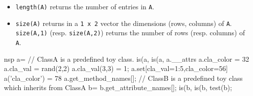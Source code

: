 \begin{itemize}
\item \verb+length(A)+ returns the number of entries in \verb+A+.
\item \verb+size(A)+ returns in a \verb+1 x 2+ vector the dimensions (rows, columns)
  of \verb+A+. \verb+size(A,1)+ (resp. \verb+size(A,2)+) returns the number of rows 
  (resp. columns) of \verb+A+.
\end{itemize}

\begin{examples}
  \begin{mintednsp}{nsp}
    a=%
    // ClassA is a predefined toy class.
    is(a,%
    is(a,%
    a.__attrs
    a.cla_color = 32 
    a.cla_val = rand(2,2)
    a.cla_val(3,3) = 1;
    a.set[cla_val=1:5,cla_color=56]
    a('cla_color') = 78 
    a.get_method_names[];
    // ClassB is a predefined toy class which inherits from ClassA
    b=%
    b.get_attribute_names[];
    is(b,%
    is(b,%
    test(b);
  \end{mintednsp}
\end{examples}

\begin{manseealso}

\end{manseealso}


